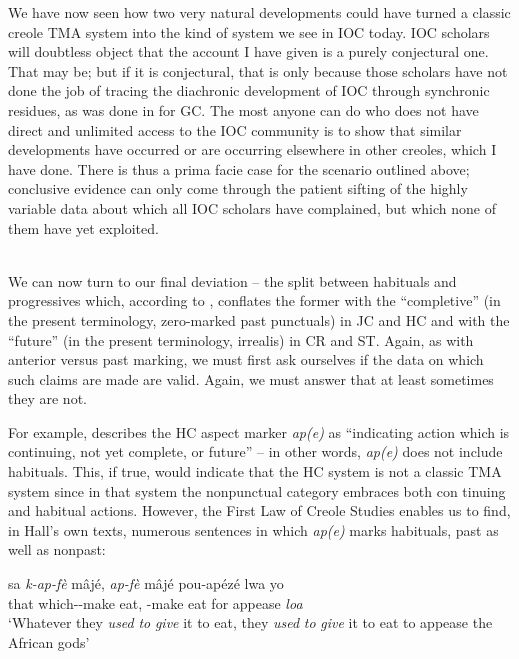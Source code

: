 We have now seen how two very natural developments could have turned a classic creole TMA system into the kind of system we see in IOC today. IOC scholars will doubtless object that the account I have given is a purely conjectural one. That may be; but if it is con\-jectural, that is only because those scholars have not done the job of tracing the diachronic development of IOC through synchronic resi\-dues, as was done in \citet{Bickerton1975} for GC. The most anyone can do who does not have direct and unlimited access to the IOC commun\-ity is to show that similar developments have occurred or are occurring elsewhere in other creoles, which I have done. There is thus a prima facie case for the scenario outlined above; conclusive evidence can only come through the patient sifting of the highly variable data about which all IOC scholars have complained, but which none of them have yet exploited.\\\\

We can now turn to our final deviation -- the split between habi\-tuals and progressives which, according to \citet{Taylor1971}, conflates the former with the ``completive'' (in the present terminology, zero-marked past punctuals) in JC and HC and with the ``future'' (in the present terminology, irrealis) in CR and ST. Again, as with anterior versus past marking, we must first ask ourselves if the data on which such claims are made are valid. Again, we must answer that at least sometimes they are not.

For example, \citet[31]{Hall1953} describes the HC aspect marker \textit{ap(e)} as ``indicating action which is continuing, not yet complete, or future'' -- in other words, \textit{ap(e)} does not include habituals. This, if true, would indicate that the HC system is not a classic TMA system since in that system the nonpunctual category embraces both con%
tinuing and habitual actions. However, the First Law of Creole Studies enables us to find, in Hall's own texts, numerous sentences in which \textit{ap(e)} marks habituals, past as well as nonpast:

\ea\label{ex:2:122}
\gll sa \textit{k-ap-fè} mâjé, \textit{ap-fè} mâjé pou-apézé lwa yo\\
that which-\ASP-make eat, \ASP-make eat {for appease} \textit{loa} {\PL}\\
\glt `Whatever they \textit{used} \textit{to} \textit{give} it to eat, they \textit{used} \textit{to} \textit{give} it to eat to appease the African gods'
\z

